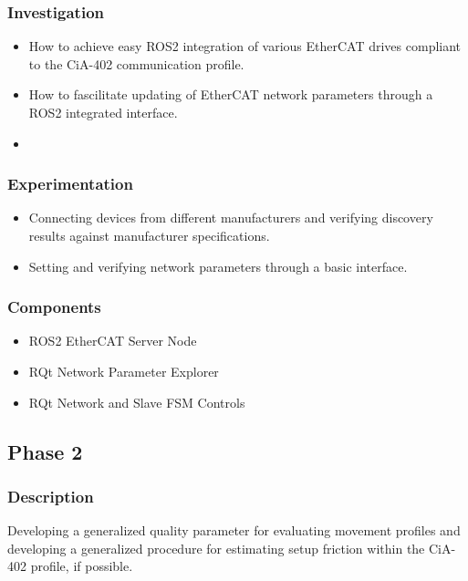 \subsubsection{Investigation}

\begin{itemize}[nosep]
	\item How to achieve easy ROS2 integration of various EtherCAT drives compliant to the CiA-402 communication profile.  
	\item How to fascilitate updating of EtherCAT network parameters through a ROS2 integrated interface.  
	\item 
\end{itemize}

\subsubsection{Experimentation} 

\begin{itemize}[nosep]
	\item Connecting devices from different manufacturers and verifying discovery results against manufacturer specifications. 
	\item Setting and verifying network parameters through a basic interface.
\end{itemize}

\subsubsection{Components}

\begin{itemize}[nosep]
	\item ROS2 EtherCAT Server Node
	\item RQt Network Parameter Explorer 
	\item RQt Network and Slave FSM Controls
\end{itemize}

\subsection{Phase 2}
\subsubsection{Description}

\noindent
Developing a generalized quality parameter for evaluating movement profiles and developing a generalized procedure for estimating setup friction within the CiA-402 profile, if possible.

